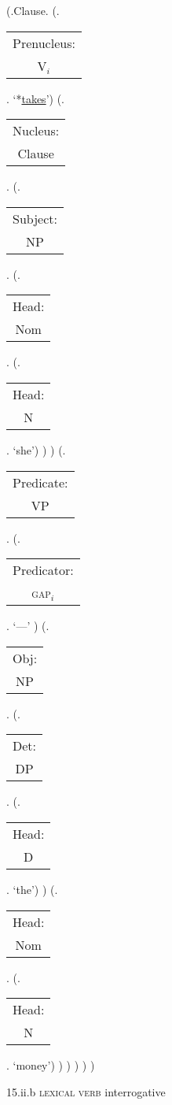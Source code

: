 \documentclass[12pt,letterpaper]{article}
\begin{document}
\begin{figure}
	\begin{center}
		\begin{parsetree}
			(.Clause.
			(.\begin{tabular}{c}Prenucleus:\\V$_i$\end{tabular}. `*\underline{takes}')
			(.\begin{tabular}{c}Nucleus:\\Clause\end{tabular}.    
			(.\begin{tabular}{c}Subject:\\NP\end{tabular}.  
			(.\begin{tabular}{c}Head:\\Nom\end{tabular}.
			(.\begin{tabular}{c}Head:\\N\end{tabular}. `she')
			)
			)
			(.\begin{tabular}{c}Predicate:\\VP\end{tabular}.
			(.\begin{tabular}{c}Predicator:\\\textsc{gap}$_i$\end{tabular}.    `---' )
			(.\begin{tabular}{c}Obj:\\NP\end{tabular}.  
			(.\begin{tabular}{c}Det:\\DP\end{tabular}.  
			(.\begin{tabular}{c}Head:\\D\end{tabular}. `the')
			)
			(.\begin{tabular}{c}Head:\\Nom\end{tabular}.
			(.\begin{tabular}{c}Head:\\N\end{tabular}. `money')
			)
			)
			)
			)
			)
			
		\end{parsetree}
		\hfill \break \hfill \break
		15.ii.b \textsc{lexical verb} interrogative
	\end{center}
\end{figure}
\end{document}
